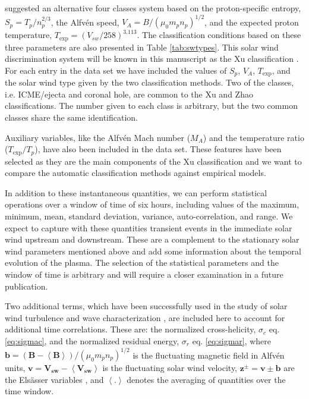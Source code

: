\documentclass[utf8]{frontiersSCNS} %
\begin{document}
\citep{Xu2015b} suggested an alternative four classes system based on the proton-specific entropy, $S_p = T_p/n_p^{2/3}$, the Alfv\'en speed, $V_A = B / (\mu_0 m_p n_p)^{1/2}$, and the expected proton temperature, $T_\text{exp} = (V_{sw}/258)^{3.113}$. The classification conditions based on these three parameters are also presented in Table \ref{tab:swtypes}. This solar wind discrimination system will be known in this manuscript as the Xu classification \citep{Xu2015b}. For each entry in the data set we have included the values of $S_p$, $V_A$, $T_\text{exp}$, and the solar wind type given by the two classification methods. Two of the classes, i.e. ICME/ejecta and coronal hole, are common to the Xu and Zhao classifications. The number given to each class is arbitrary, but the two common classes share the same identification.

Auxiliary variables, like the Alfv\'en Mach number ($M_A$) and the temperature ratio ($T_\text{exp}/T_p$), have also been included in the data set. These features have been selected as they are the main components of the Xu classification and we want to compare the automatic classification methods against empirical models.

In addition to these instantaneous quantities, we can perform statistical operations over a window of time of six hours, including values of the maximum, minimum, mean, standard deviation, variance, auto-correlation, and range. We expect to capture with these quantities transient events in the immediate solar wind upstream and downstream. These are a complement to the stationary solar wind parameters mentioned above and add some information about the temporal evolution of the plasma. The selection of the statistical parameters and the window of time is arbitrary and will require a closer examination in a future publication.

Two additional terms, which have been successfully used in the study of solar wind turbulence and wave characterization \citep{Zhao2018,Adhikari2020,Magyar2019,DAmicis2015}, are included here to account for additional time correlations. These are: the normalized cross-helicity, $\sigma_c$ eq. \eqref{eq:sigmac}, and the normalized residual energy, $\sigma_r$ eq. \eqref{eq:sigmar}, where $\boldsymbol{b} = \left(\boldsymbol{B}- \boldsymbol{\left<B\right>}\right)/(\mu_0m_pn_p)^{1/2}$ is the fluctuating magnetic field in Alfv\'en units, $\boldsymbol{v} = \boldsymbol{V_{sw}}- \boldsymbol{\left<V_{sw}\right>}$ is the fluctuating solar wind velocity, $\boldsymbol{z^\pm} = \boldsymbol{v} \pm \boldsymbol{b}$ are the Els\"asser variables \citep{PhysRev.79.183}, and $\left<.\right>$ denotes the averaging of quantities over the time window.
\end{document}

